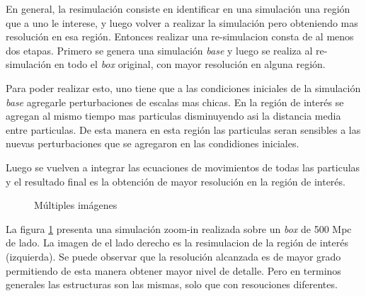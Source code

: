 En general, la resimulaci\'on consiste en identificar en una simulaci\'on una regi\'on que a uno le interese, y luego volver a realizar la simulaci\'on pero obteniendo mas resoluci\'on en esa regi\'on. Entonces realizar una re-simulacion consta de al menos dos etapas. Primero se genera una simulaci\'on \textit{base} y luego se realiza al re-simulaci\'on en todo el \textit{box} original, con mayor resoluci\'on en alguna regi\'on. 

Para poder realizar esto, uno tiene que a las condiciones iniciales de la simulaci\'on \textit{base} agregarle perturbaciones de escalas mas chicas. En la regi\'on de inter\'es se agregan al mismo tiempo mas particulas disminuyendo asi la distancia media entre particulas. De esta manera en esta regi\'on las particulas seran sensibles a las nuevas perturbaciones que se agregaron en las condidiones iniciales.

Luego se vuelven a integrar las ecuaciones de movimientos de todas las particulas y el resultado final es la obtenci\'on de mayor resoluci\'on en la regi\'on de inter\'es. 




\begin{figure}
 \centering
  
 \caption{Múltiples imágenes}
 \label{Resimulacion}
 
\end{figure}
 

La figura \ref{Resimulacion} presenta una simulaci\'on zoom-in realizada sobre un \textit{box} de 500 Mpc de lado. La imagen de el lado derecho es la resimulacion de la regi\'on de inter\'es (izquierda). Se puede observar que la resoluci\'on alcanzada es de mayor grado permitiendo de esta manera obtener mayor nivel de detalle. Pero en terminos generales las estructuras son las mismas, solo que con resouciones diferentes. 



